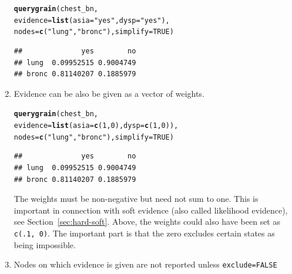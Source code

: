 \documentclass[10pt]{article}\usepackage[]{graphicx}\usepackage[]{xcolor}
\makeatletter
\newcommand{\hlnum}[1]{\textcolor[rgb]{0.686,0.059,0.569}{#1}}%
\newcommand{\hlstr}[1]{\textcolor[rgb]{0.192,0.494,0.8}{#1}}%
\newcommand{\hlstd}[1]{\textcolor[rgb]{0.345,0.345,0.345}{#1}}%
\newcommand{\hlkwc}[1]{\textcolor[rgb]{0.333,0.667,0.333}{#1}}%
\newcommand{\hlkwd}[1]{\textcolor[rgb]{0.737,0.353,0.396}{\textbf{#1}}}%
\newenvironment{kframe}{%
 \def\at@end@of@kframe{}%
 \ifinner\ifhmode%
  \def\at@end@of@kframe{\end{minipage}}%
  \begin{minipage}{\columnwidth}%
 \fi\fi%
 \def\FrameCommand##1{\hskip\@totalleftmargin \hskip-\fboxsep
 \colorbox{shadecolor}{##1}\hskip-\fboxsep
     \hskip-\linewidth \hskip-\@totalleftmargin \hskip\columnwidth}%
 \MakeFramed {\advance\hsize-\width
   \@totalleftmargin\z@ \linewidth\hsize
   \@setminipage}}%
 {\par\unskip\endMakeFramed%
 \at@end@of@kframe}
\newenvironment{knitrout}{}{} %
\def\code#1{{\texttt{#1}}}
\makeatother
\begin{document}
\begin{enumerate}
\begin{knitrout}
\color{fgcolor}\begin{kframe}
\begin{alltt}
\hlkwd{querygrain}\hlstd{(chest_bn,}
           \hlkwc{evidence}\hlstd{=}\hlkwd{list}\hlstd{(}\hlkwc{asia}\hlstd{=}\hlstr{"yes"}\hlstd{,} \hlkwc{dysp}\hlstd{=}\hlstr{"yes"}\hlstd{),}
           \hlkwc{nodes}\hlstd{=}\hlkwd{c}\hlstd{(}\hlstr{"lung"}\hlstd{,} \hlstr{"bronc"}\hlstd{),} \hlkwc{simplify} \hlstd{=} \hlnum{TRUE}\hlstd{)}
\end{alltt}
\begin{verbatim}
##              yes        no
## lung  0.09952515 0.9004749
## bronc 0.81140207 0.1885979
\end{verbatim}
\end{kframe}
\end{knitrout}

\item Evidence can be also be given as a vector of weights. 

\begin{knitrout}
\color{fgcolor}\begin{kframe}
\begin{alltt}
\hlkwd{querygrain}\hlstd{(chest_bn,}
           \hlkwc{evidence}\hlstd{=}\hlkwd{list}\hlstd{(}\hlkwc{asia}\hlstd{=}\hlkwd{c}\hlstd{(}\hlnum{1}\hlstd{,}\hlnum{0}\hlstd{),} \hlkwc{dysp}\hlstd{=}\hlkwd{c}\hlstd{(}\hlnum{1}\hlstd{,}\hlnum{0}\hlstd{)),}
           \hlkwc{nodes}\hlstd{=}\hlkwd{c}\hlstd{(}\hlstr{"lung"}\hlstd{,} \hlstr{"bronc"}\hlstd{),} \hlkwc{simplify} \hlstd{=} \hlnum{TRUE}\hlstd{)}
\end{alltt}
\begin{verbatim}
##              yes        no
## lung  0.09952515 0.9004749
## bronc 0.81140207 0.1885979
\end{verbatim}
\end{kframe}
\end{knitrout}

The weights must be non-negative but need not sum to one. This is
important in connection with soft evidence (also called likelihood
evidence), see Section~\ref{sec:hard-soft}. Above, the weights could
also have been set as \code{c(.1, 0)}. The important part is that the
zero excludes certain states as being impossible.


\item Nodes on which evidence is given are not reported unless \code{exclude=FALSE}


\end{enumerate}
\end{document}
